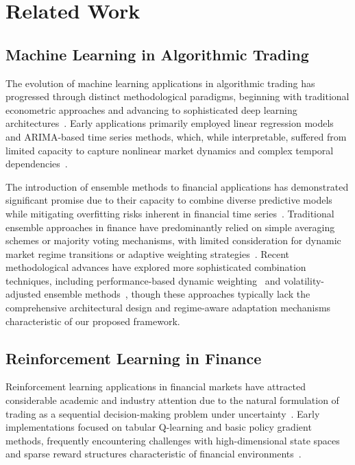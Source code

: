 \documentclass[10pt,twocolumn]{article}
\begin{document}
\section{Related Work}

\subsection{Machine Learning in Algorithmic Trading}

The evolution of machine learning applications in algorithmic trading has progressed through distinct methodological paradigms, beginning with traditional econometric approaches and advancing to sophisticated deep learning architectures~\cite{dixon2020machine}. Early applications primarily employed linear regression models and ARIMA-based time series methods, which, while interpretable, suffered from limited capacity to capture nonlinear market dynamics and complex temporal dependencies~\cite{taylor2007forecasting}.

The introduction of ensemble methods to financial applications has demonstrated significant promise due to their capacity to combine diverse predictive models while mitigating overfitting risks inherent in financial time series~\cite{breiman2001random}. Traditional ensemble approaches in finance have predominantly relied on simple averaging schemes or majority voting mechanisms, with limited consideration for dynamic market regime transitions or adaptive weighting strategies~\cite{timmermann2006forecast}. Recent methodological advances have explored more sophisticated combination techniques, including performance-based dynamic weighting~\cite{rapach2010out} and volatility-adjusted ensemble methods~\cite{guidolin2018portfolio}, though these approaches typically lack the comprehensive architectural design and regime-aware adaptation mechanisms characteristic of our proposed framework.

\subsection{Reinforcement Learning in Finance}

Reinforcement learning applications in financial markets have attracted considerable academic and industry attention due to the natural formulation of trading as a sequential decision-making problem under uncertainty~\cite{sutton2018reinforcement}. Early implementations focused on tabular Q-learning and basic policy gradient methods, frequently encountering challenges with high-dimensional state spaces and sparse reward structures characteristic of financial environments~\cite{moody1998performance}. 
\end{document}
